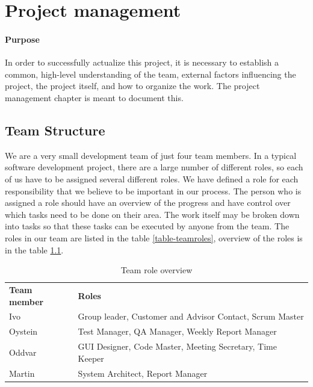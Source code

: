 \chapter{Project management}

\minitoc

\subsubsection{Purpose}

In order to successfully actualize this project, it is necessary to establish a common, high-level understanding of the team, external factors influencing the project, the project itself, and how to organize the work. The project management chapter is meant to document this.

\clearpage

\section{Team Structure}
We are a very small development team of just four team members. In a typical software development project, there are a large number of different roles, so each of us have to be assigned several different roles. We have defined a role for each responsibility that we believe to be important in our process. The person who is assigned a role should have an overview of the progress and have control over which tasks need to be done on their area. The work itself may be broken down into tasks so that these tasks can be executed by anyone from the team. The roles in our team are listed in the table \ref{table-teamroles}, overview of the roles is in the table \ref{table-rolesoverview}.

\begin{table}
\centering
\begin{tabular}{ l  l }
  \hline
  \textbf{Team member} & \textbf{Roles} \\
  Ivo & Group leader, Customer and Advisor Contact, Scrum Master \\
  Oystein & Test Manager, QA Manager, Weekly Report Manager \\
  Oddvar & GUI Designer, Code Master, Meeting Secretary, Time Keeper \\
  Martin & System Architect, Report Manager \\
  \hline
\end{tabular}
\label{table-rolesoverview}
\caption{Team role overview}
\end{table}


